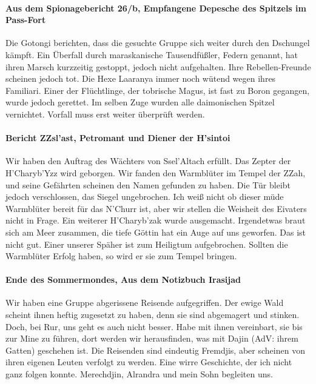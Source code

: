 \paragraph{Aus dem Spionagebericht 26/b, Empfangene Depesche des Spitzels im Pass-Fort}
Die Gotongi berichten, dass die gesuchte Gruppe sich weiter durch den Dschungel kämpft. Ein Überfall durch maraskanische Tausendfüßler, Federn genannt, hat ihren Marsch kurzzeitig gestoppt, jedoch nicht aufgehalten. Ihre Rebellen-Freunde scheinen jedoch tot. Die Hexe Laaranya immer noch wütend wegen ihres Familiari. Einer der Flüchtlinge, der tobrische Magus, ist fast zu Boron gegangen, wurde jedoch gerettet. Im selben Zuge wurden alle daimonischen Spitzel vernichtet. Vorfall muss erst weiter überprüft werden.

\paragraph{Bericht ZZsl'ast, Petromant und Diener der H'sintoi}
Wir haben den Auftrag des Wächters von Ssel'Altach erfüllt. Das Zepter der H'Charyb'Yzz wird geborgen. Wir fanden den Warmblüter im Tempel der ZZah, und seine Gefährten scheinen den Namen gefunden zu haben. Die Tür bleibt jedoch verschlossen, das Siegel ungebrochen.
Ich weiß nicht ob dieser müde Warmblüter bereit für das N'Churr ist, aber wir stellen die Weisheit des Eivaters nicht in Frage. Ein weiterer H'Charyb'zak wurde ausgemacht. Irgendetwas braut sich am Meer zusammen, die tiefe Göttin hat ein Auge auf uns geworfen. Das ist nicht gut.
Einer unserer Späher ist zum Heiligtum aufgebrochen. Sollten die Warmblüter Erfolg haben, so wird er sie zum Tempel bringen.

\paragraph{Ende des Sommermondes, Aus dem Notizbuch Irasijad}
Wir haben eine Gruppe abgerissene Reisende aufgegriffen. Der ewige Wald scheint ihnen heftig zugesetzt zu haben, denn sie sind abgemagert und stinken. Doch, bei Rur, uns geht es auch nicht besser. Habe mit ihnen vereinbart, sie bis zur Mine zu führen, dort werden wir herausfinden, was mit Dajin (AdV: ihrem Gatten) geschehen ist. Die Reisenden sind eindeutig Fremdjis, aber scheinen von ihren eigenen Leuten verfolgt zu werden. Eine wirre Geschichte, der ich nicht ganz folgen konnte. Merechdjin, Alrandra und mein Sohn begleiten uns.

